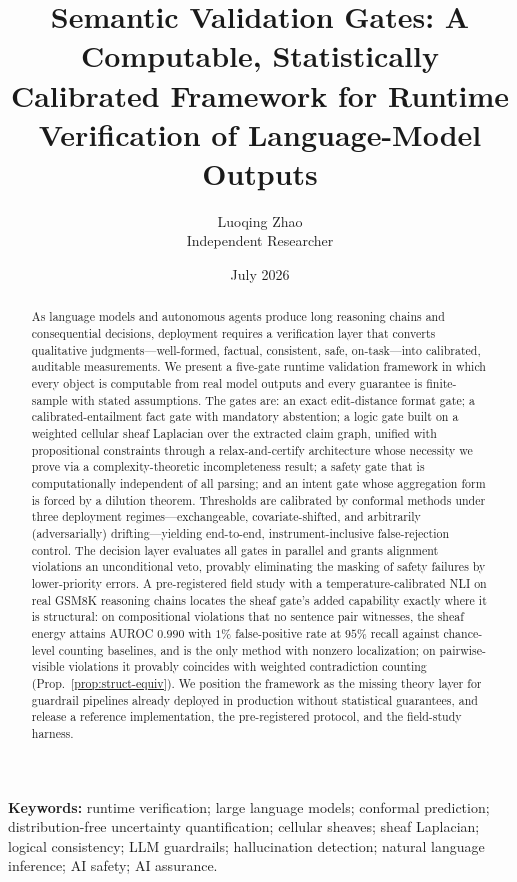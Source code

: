 \documentclass[11pt]{article}
\title{\textbf{Semantic Validation Gates: A Computable, Statistically
Calibrated Framework for Runtime Verification of Language-Model Outputs}}
\author{Luoqing Zhao\\ \small Independent Researcher}
\date{July 2026}
\theoremstyle{remark}
\begin{document}
\maketitle

\begin{abstract}
As language models and autonomous agents produce long reasoning chains and
consequential decisions, deployment requires a verification layer that converts
qualitative judgments---well-formed, factual, consistent, safe, on-task---into
calibrated, auditable measurements. We present a five-gate runtime validation
framework in which every object is computable from real model outputs and every
guarantee is finite-sample with stated assumptions. The gates are: an exact
edit-distance format gate; a calibrated-entailment fact gate with mandatory
abstention; a logic gate built on a weighted cellular sheaf Laplacian over the
extracted claim graph, unified with propositional constraints through a
relax-and-certify architecture whose necessity we prove via a
complexity-theoretic incompleteness result; a safety gate that is
computationally independent of all parsing; and an intent gate whose
aggregation form is forced by a dilution theorem. Thresholds are calibrated by
conformal methods under three deployment regimes---exchangeable,
covariate-shifted, and arbitrarily (adversarially) drifting---yielding
end-to-end, instrument-inclusive false-rejection control. The decision layer
evaluates all gates in parallel and grants alignment violations an
unconditional veto, provably eliminating the masking of safety failures by
lower-priority errors. A pre-registered field study with a temperature-calibrated
NLI on real GSM8K reasoning chains locates the sheaf gate's added capability
exactly where it is structural: on compositional violations that no sentence
pair witnesses, the sheaf energy attains AUROC $0.990$ with $1\%$ false-positive
rate at $95\%$ recall against chance-level counting baselines, and is the only
method with nonzero localization; on pairwise-visible violations it provably
coincides with weighted contradiction counting (Prop.~\ref{prop:struct-equiv}).
We position the framework as the missing theory layer for guardrail pipelines
already deployed in production without statistical guarantees, and release a
reference implementation, the pre-registered protocol, and the field-study
harness.
\end{abstract}

\vspace{0.5em}
\noindent\textbf{\small Keywords:} {\small runtime verification; large
language models; conformal prediction; distribution-free uncertainty
quantification; cellular sheaves; sheaf Laplacian; logical consistency;
LLM guardrails; hallucination detection; natural language inference;
AI safety; AI assurance.}
\end{document}
